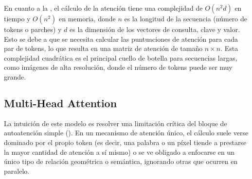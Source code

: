 \begin{observacion}
    En cuanto a la , el cálculo de la atención tiene una complejidad de $O(n^2 d)$ en tiempo y $O(n^2)$ en memoria, donde $n$ es la longitud de la secuencia (número de tokens o parches) y $d$ es la dimensión de los vectores de consulta, clave y valor. Esto se debe a que se necesita calcular las puntuaciones de atención para cada par de tokens, lo que resulta en una matriz de atención de tamaño $n \times n$. Esta complejidad cuadrática es el principal cuello de botella para secuencias largas, como imágenes de alta resolución, donde el número de tokens puede ser muy grande.
\end{observacion}

\subsection{Multi-Head Attention}
\noindent
La intuición de este modelo es resolver una limitación crítica del bloque de autoatención simple (). En un mecanismo de atención único, el cálculo suele verse dominado por el propio token (es decir, una palabra o un píxel tiende a prestarse la mayor cantidad de atención a sí mismo) o se ve obligado a enfocarse en un único tipo de relación geométrica o semántica, ignorando otras que ocurren en paralelo. \\ \\

